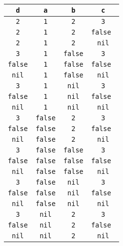 \begin{table}[H]
    \centering
    \begin{tabular}{|c|c|c|c|}
        \hline
        \texttt{d} & \texttt{a}  & \texttt{b}  & \texttt{c}  \\
        \hline
		\texttt{  2  } & \texttt{  1  } & \texttt{  2  } & \texttt{  3   } \\
		\texttt{  2  } & \texttt{  1  } & \texttt{  2  } & \texttt{false } \\
		\texttt{  2  } & \texttt{  1  } & \texttt{  2  } & \texttt{ nil  } \\
		\texttt{  3  } & \texttt{  1  } & \texttt{false} & \texttt{  3   } \\
		\texttt{false} & \texttt{  1  } & \texttt{false} & \texttt{false } \\
		\texttt{ nil } & \texttt{  1  } & \texttt{false} & \texttt{ nil  } \\
		\texttt{  3  } & \texttt{  1  } & \texttt{ nil } & \texttt{  3   } \\
		\texttt{false} & \texttt{  1  } & \texttt{ nil } & \texttt{false } \\
		\texttt{ nil } & \texttt{  1  } & \texttt{ nil } & \texttt{ nil  } \\
		\texttt{  3  } & \texttt{false} & \texttt{  2  } & \texttt{  3   } \\
		\texttt{false} & \texttt{false} & \texttt{  2  } & \texttt{false } \\
		\texttt{ nil } & \texttt{false} & \texttt{  2  } & \texttt{ nil  } \\
		\texttt{  3  } & \texttt{false} & \texttt{false} & \texttt{  3   } \\
		\texttt{false} & \texttt{false} & \texttt{false} & \texttt{false } \\
		\texttt{ nil } & \texttt{false} & \texttt{false} & \texttt{ nil  } \\
		\texttt{  3  } & \texttt{false} & \texttt{ nil } & \texttt{  3   } \\
		\texttt{false} & \texttt{false} & \texttt{ nil } & \texttt{false } \\
		\texttt{ nil } & \texttt{false} & \texttt{ nil } & \texttt{ nil  } \\
		\texttt{  3  } & \texttt{ nil } & \texttt{  2  } & \texttt{  3   } \\
		\texttt{false} & \texttt{ nil } & \texttt{  2  } & \texttt{false } \\
		\texttt{ nil } & \texttt{ nil } & \texttt{  2  } & \texttt{ nil  } \\

\end{tabular}
\end{table}
